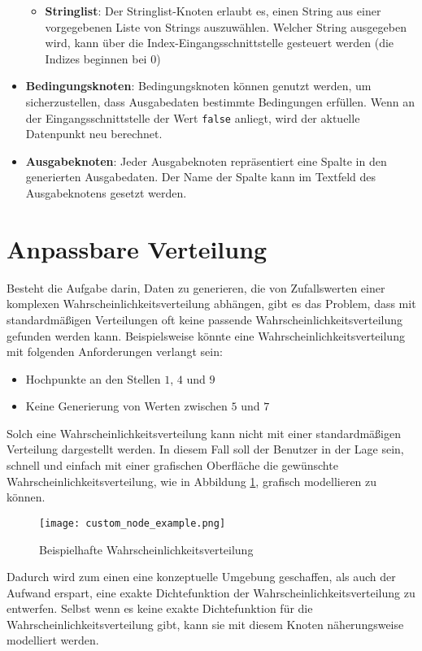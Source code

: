 \begin{itemize}
\begin{itemize}
        \item \textbf{Stringlist}: Der Stringlist-Knoten erlaubt es, einen String aus einer vorgegebenen Liste von Strings auszuwählen. Welcher String ausgegeben wird, kann über die Index-Eingangsschnittstelle gesteuert werden (die Indizes beginnen bei 0)
    \end{itemize}
    \item \textbf{Bedingungsknoten}: Bedingungsknoten können genutzt werden, um sicherzustellen, dass Ausgabedaten bestimmte Bedingungen erfüllen. Wenn an der Eingangsschnittstelle der Wert \texttt{false} anliegt, wird der aktuelle Datenpunkt neu berechnet.
    \item \textbf{Ausgabeknoten}: Jeder Ausgabeknoten repräsentiert eine Spalte in den generierten Ausgabedaten. Der Name der Spalte kann im Textfeld des Ausgabeknotens gesetzt werden.
\end{itemize}

\section{Anpassbare Verteilung}
\label{sec:anpassbareverteilung}

Besteht die Aufgabe darin, Daten zu generieren, die von Zufallswerten einer komplexen Wahrscheinlichkeitsverteilung abhängen, gibt es das Problem, dass mit standardmäßigen Verteilungen oft keine passende Wahrscheinlichkeitsverteilung gefunden werden kann. Beispielsweise könnte eine Wahrscheinlichkeitsverteilung mit folgenden Anforderungen verlangt sein:
\begin{itemize}
    \item Hochpunkte an den Stellen $1$, $4$ und $9$
    \item Keine Generierung von Werten zwischen $5$ und $7$
\end{itemize}
Solch eine Wahrscheinlichkeitsverteilung kann nicht mit einer standardmäßigen Verteilung dargestellt werden. In diesem Fall soll der Benutzer in der Lage sein, schnell und einfach mit einer grafischen Oberfläche die gewünschte Wahrscheinlichkeitsverteilung, wie in Abbildung \ref{fig:customnodeexample}, grafisch modellieren zu können.
\begin{figure}[H]
    \centering
    \texttt{[image: custom\_node\_example.png]}
    \caption{Beispielhafte Wahrscheinlichkeitsverteilung}
    \label{fig:customnodeexample}
\end{figure}
Dadurch wird zum einen eine konzeptuelle Umgebung geschaffen, als auch der Aufwand erspart, eine exakte Dichtefunktion der Wahrscheinlichkeitsverteilung zu entwerfen. Selbst wenn es keine exakte Dichtefunktion für die Wahrscheinlichkeitsverteilung gibt, kann sie mit diesem Knoten näherungsweise modelliert werden. 

